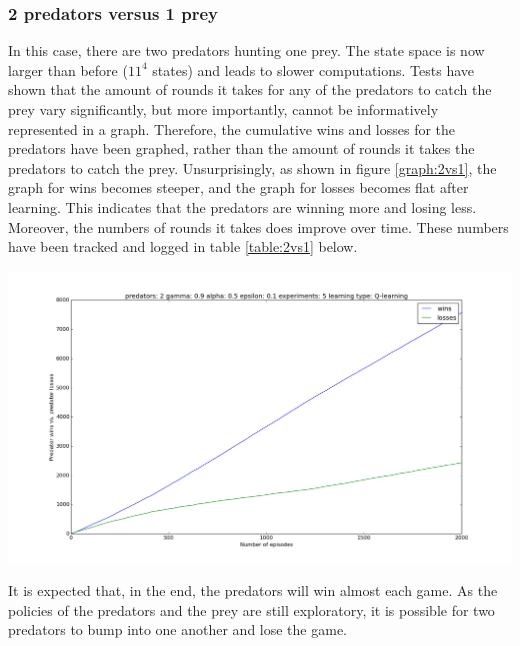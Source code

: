 \subsubsection{2 predators versus 1 prey}
In this case, there are two predators hunting one prey. The state space is now larger than before ($11^4$ states) and leads to slower computations. Tests have shown that the amount of rounds it takes for any of the predators to catch the prey vary significantly, but more importantly, cannot be informatively represented in a graph. Therefore, the cumulative wins and losses for the predators have been graphed, rather than the amount of rounds it takes the predators to catch the prey. Unsurprisingly,  as shown in figure \ref{graph:2vs1}, the graph for wins becomes steeper, and the graph for losses becomes flat after learning. This indicates that the predators are winning more and losing less. Moreover, the numbers of rounds it takes does improve over time. These numbers have been tracked and logged in table \ref{table:2vs1} below.

\begin{center}
	\includegraphics[scale=0.3]{2_predators_q_learning}
	\label{graph:2vs1}
\end{center}


It is expected that, in the end, the predators will win almost each game. As the policies of the predators and the prey are still exploratory, it is possible for two predators to bump into one another and lose the game.

